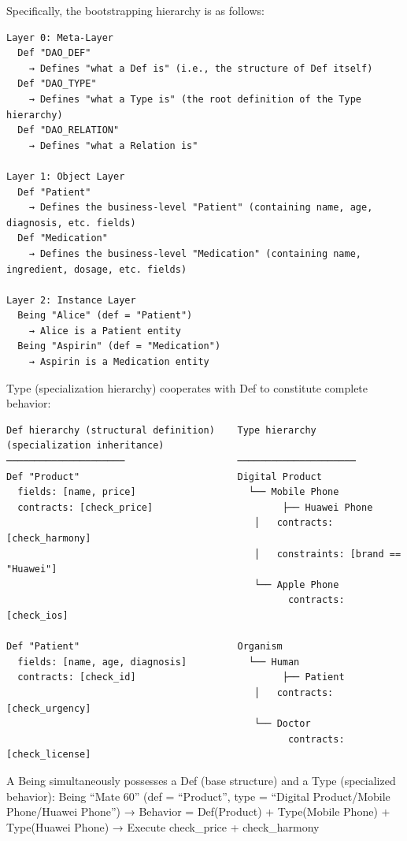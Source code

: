 \documentclass[11pt,a4paper]{article}
\begin{document}
Specifically, the bootstrapping hierarchy is as follows:

\begin{verbatim}
Layer 0: Meta-Layer
  Def "DAO_DEF"
    → Defines "what a Def is" (i.e., the structure of Def itself)
  Def "DAO_TYPE"
    → Defines "what a Type is" (the root definition of the Type hierarchy)
  Def "DAO_RELATION"
    → Defines "what a Relation is"

Layer 1: Object Layer
  Def "Patient"
    → Defines the business-level "Patient" (containing name, age, diagnosis, etc. fields)
  Def "Medication"
    → Defines the business-level "Medication" (containing name, ingredient, dosage, etc. fields)

Layer 2: Instance Layer
  Being "Alice" (def = "Patient")
    → Alice is a Patient entity
  Being "Aspirin" (def = "Medication")
    → Aspirin is a Medication entity
\end{verbatim}

Type (specialization hierarchy) cooperates with Def to constitute
complete behavior:

\begin{verbatim}
Def hierarchy (structural definition)    Type hierarchy (specialization inheritance)
─────────────────────                    ─────────────────────
Def "Product"                            Digital Product
  fields: [name, price]                    └── Mobile Phone
  contracts: [check_price]                       ├── Huawei Phone
                                            │   contracts: [check_harmony]
                                            │   constraints: [brand == "Huawei"]
                                            └── Apple Phone
                                                  contracts: [check_ios]

Def "Patient"                            Organism
  fields: [name, age, diagnosis]           └── Human
  contracts: [check_id]                          ├── Patient
                                            │   contracts: [check_urgency]
                                            └── Doctor
                                                  contracts: [check_license]
\end{verbatim}

A Being simultaneously possesses a Def (base structure) and a Type
(specialized behavior): Being ``Mate 60'' (def = ``Product'', type =
``Digital Product/Mobile Phone/Huawei Phone'') → Behavior = Def(Product)
+ Type(Mobile Phone) + Type(Huawei Phone) → Execute check\_price +
check\_harmony
\end{document}
